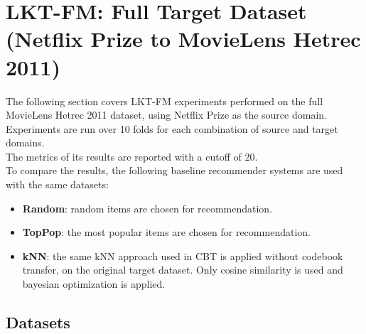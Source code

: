 \clearpage



\section{LKT-FM: Full Target Dataset (Netflix Prize to MovieLens Hetrec 2011)}

The following section covers LKT-FM experiments performed on the full MovieLens Hetrec 2011 dataset, using Netflix Prize as the source domain.\\
Experiments are run over 10 folds for each combination of source and target domains.\\
The metrics of its results are reported with a cutoff of 20.\\
To compare the results, the following baseline recommender systems are used with the same datasets:
\begin{itemize}
\item \textbf{Random}: random items are chosen for recommendation.
\item \textbf{TopPop}: the most popular items are chosen for recommendation.
\item \textbf{kNN}: the same kNN approach used in CBT is applied without codebook transfer, on the original target dataset. Only cosine similarity is used and bayesian optimization is applied.
\end{itemize}


\subsection{Datasets}

